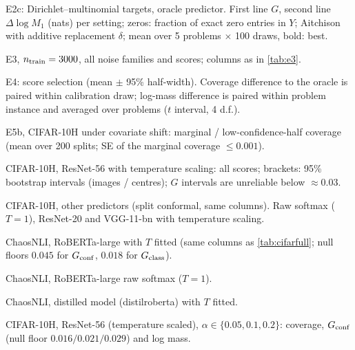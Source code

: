 \begin{table}[h]
\caption{E2c: Dirichlet--multinomial targets, oracle predictor. First line $G$, second line $\Delta\log M_1$ (nats) per setting; zeros: fraction of exact zero entries in $Y$; Aitchison with additive replacement $\delta$; mean over 5 problems $\times$ 100 draws, bold: best.}\label{tab:e2c}
\centering\scriptsize
\end{table}
\begin{table}[h]
\caption{E3, $n_{\rm train}=3000$, all noise families and scores; columns as in \cref{tab:e3}.}\label{tab:e3full}
\centering\scriptsize
\end{table}
\begin{table}[h]
\caption{E4: score selection (mean $\pm$ 95\% half-width). Coverage difference to the oracle is paired within calibration draw; log-mass difference is paired within problem instance and averaged over problems ($t$ interval, 4 d.f.).}\label{tab:e4}
\centering\scriptsize
\end{table}
\begin{table}[h]
\caption{E5b, CIFAR-10H under covariate shift: marginal / low-confidence-half coverage (mean over 200 splits; SE of the marginal coverage $\le0.001$).}\label{tab:e5b}
\centering\small
\end{table}
\begin{table}[h]
\caption{CIFAR-10H, ResNet-56 with temperature scaling: all scores; brackets: 95\% bootstrap intervals (images / centres); $G$ intervals are unreliable below $\approx0.03$.}\label{tab:cifarfull}
\centering\scriptsize
\end{table}
\begin{table}[h]
\caption{CIFAR-10H, other predictors (split conformal, same columns). Raw softmax ($T=1$), ResNet-20 and VGG-11-bn with temperature scaling.}\label{tab:cifarother}
\centering\scriptsize

\end{table}
\begin{table}[h]
\caption{ChaosNLI, RoBERTa-large with $T$ fitted (same columns as \cref{tab:cifarfull}; null floors $0.045$ for $G_{\rm conf}$, $0.018$ for $G_{\rm class}$).}\label{tab:nlifull}
\centering\scriptsize
\end{table}
\begin{table}[h]
\caption{ChaosNLI, RoBERTa-large raw softmax ($T=1$).}\label{tab:nliraw}
\centering\scriptsize
\end{table}
\begin{table}[h]
\caption{ChaosNLI, distilled model (distilroberta) with $T$ fitted.}\label{tab:nlidistil}
\centering\scriptsize
\end{table}
\begin{table}[h]
\caption{CIFAR-10H, ResNet-56 (temperature scaled), $\alpha\in\{0.05,0.1,0.2\}$: coverage, $G_{\rm conf}$ (null floor $0.016/0.021/0.029$) and log mass.}\label{tab:alpha}
\centering\scriptsize
\end{table}


